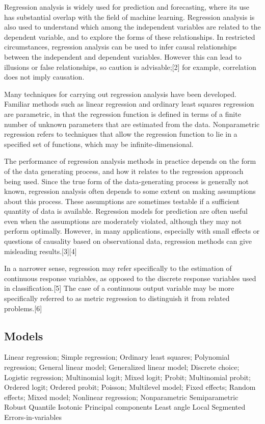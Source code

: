 \documentclass[11pt,a4paper]{article}
\begin{document}
Regression analysis is widely used for prediction and forecasting, where its use has substantial overlap with the field of machine learning. Regression analysis is also used to understand which among the independent variables are related to the dependent variable, and to explore the forms of these relationships. In restricted circumstances, regression analysis can be used to infer causal relationships between the independent and dependent variables. However this can lead to illusions or false relationships, so caution is advisable;[2] for example, correlation does not imply causation.

Many techniques for carrying out regression analysis have been developed. Familiar methods such as linear regression and ordinary least squares regression are parametric, in that the regression function is defined in terms of a finite number of unknown parameters that are estimated from the data. Nonparametric regression refers to techniques that allow the regression function to lie in a specified set of functions, which may be infinite-dimensional.

The performance of regression analysis methods in practice depends on the form of the data generating process, and how it relates to the regression approach being used. Since the true form of the data-generating process is generally not known, regression analysis often depends to some extent on making assumptions about this process. These assumptions are sometimes testable if a sufficient quantity of data is available. Regression models for prediction are often useful even when the assumptions are moderately violated, although they may not perform optimally. However, in many applications, especially with small effects or questions of causality based on observational data, regression methods can give misleading results.[3][4]

In a narrower sense, regression may refer specifically to the estimation of continuous response variables, as opposed to the discrete response variables used in classification.[5] The case of a continuous output variable may be more specifically referred to as metric regression to distinguish it from related problems.[6]

\subsection{Models}
Linear regression; Simple regression; Ordinary least squares; Polynomial regression; General linear model;
Generalized linear model; Discrete choice; Logistic regression; Multinomial logit; Mixed logit; Probit; Multinomial probit; Ordered logit; Ordered probit; Poisson; Multilevel model; Fixed effects; Random effects; Mixed model; Nonlinear regression; Nonparametric Semiparametric Robust Quantile Isotonic Principal components Least angle Local Segmented
Errors-in-variables
\end{document}
